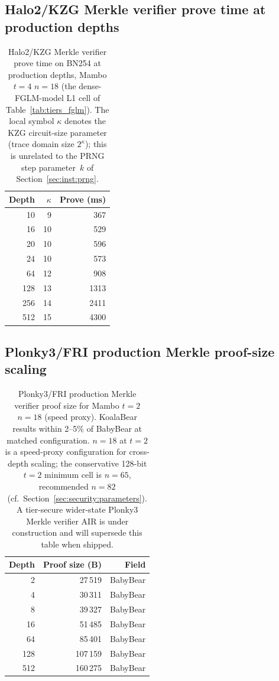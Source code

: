 \documentclass[11pt,a4paper]{article}
\theoremstyle{definition}
\begin{document}
\subsection{Halo2/KZG Merkle verifier prove time at production depths}

\begin{table}[H]
\centering
\caption{Halo2/KZG Merkle verifier prove time on BN254 at production
depths, Mambo $t=4$ $n=18$ (the dense-FGLM-model L1 cell of
Table~\ref{tab:tiers_fglm}). The local symbol
$\kappa$ denotes the KZG circuit-size parameter (trace domain size
$2^\kappa$); this is unrelated to the PRNG step parameter~$k$ of
Section~\ref{sec:inst:prng}.}
\label{tab:perf-merkle-halo2}
\small
\begin{tabular}{@{}rrr@{}}
\toprule
Depth & $\kappa$ & Prove (ms) \\
\midrule
10  & 9  & 367 \\
16  & 10 & 529 \\
20  & 10 & 596 \\
24  & 10 & 573 \\
64  & 12 & 908 \\
128 & 13 & 1313 \\
256 & 14 & 2411 \\
512 & 15 & 4300 \\
\bottomrule
\end{tabular}
\end{table}

\subsection{Plonky3/FRI production Merkle proof-size scaling}

\begin{table}[H]
\centering
\caption{Plonky3/FRI production Merkle verifier proof size for Mambo
$t=2$ $n=18$ (speed proxy). KoalaBear results within 2--5\% of BabyBear
at matched configuration. $n=18$ at $t=2$ is a speed-proxy
configuration for cross-depth scaling; the conservative 128-bit $t=2$
minimum cell is $n=65$, recommended $n=82$
(cf.\ Section~\ref{sec:security:parameters}). A
tier-secure wider-state Plonky3 Merkle verifier AIR is under
construction and will supersede this table when shipped.}
\label{tab:perf-plonky3-merkle}
\small
\begin{tabular}{@{}rrr@{}}
\toprule
Depth & Proof size (B) & Field \\
\midrule
2   &  27\,519 & BabyBear \\
4   &  30\,311 & BabyBear \\
8   &  39\,327 & BabyBear \\
16  &  51\,485 & BabyBear \\
64  &  85\,401 & BabyBear \\
128 & 107\,159 & BabyBear \\
512 & 160\,275 & BabyBear \\
\bottomrule
\end{tabular}
\end{table}
\end{document}
